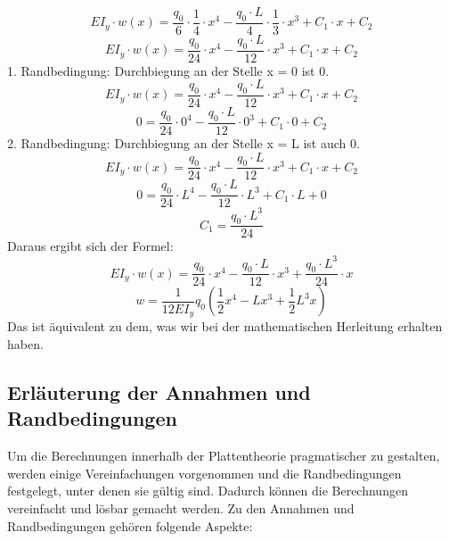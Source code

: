 \begin{equation}
	EI_y\cdot w\left(x\right)=
	\frac{q_0}{6}\cdot\frac{1}{4}\cdot x^4-\frac{q_0\cdot L}{4}\cdot\frac{1}{3}\cdot x^3+C_1\cdot x+C_2
\end{equation}
\begin{equation}
	EI_y\cdot w\left(x\right)=
	\frac{q_0}{24}\cdot x^4-\frac{q_0\cdot L}{12}\cdot x^3+C_1\cdot x+C_2
\end{equation}
1. Randbedingung: Durchbiegung an der Stelle x = 0 ist 0.
\begin{equation}
	EI_y\cdot w\left(x\right)=
	\frac{q_0}{24}\cdot x^4-\frac{q_0\cdot L}{12}\cdot x^3+C_1\cdot x+C_2
\end{equation}
\begin{equation}
	0=
	\frac{q_0}{24}\cdot0^4-\frac{q_0\cdot L}{12}\cdot0^3+C_1\cdot0+C_2
\end{equation}
2. Randbedingung: Durchbiegung an der Stelle x = L ist auch 0.
\begin{equation}
	EI_y\cdot w\left(x\right)=
	\frac{q_0}{24}\cdot x^4-\frac{q_0\cdot L}{12}\cdot x^3+C_1\cdot x+C_2
\end{equation}
\begin{equation}
	0=
	\frac{q_0}{24}\cdot L^4-\frac{q_0\cdot L}{12}\cdot L^3+C_1\cdot L+0
\end{equation}
\begin{equation}
	C_1=
	\frac{q_0\cdot L^3}{24}
\end{equation}
Daraus ergibt sich der Formel:
\begin{equation}
	EI_y\cdot w\left(x\right)=
	\frac{q_0}{24}\cdot x^4-\frac{q_0\cdot L}{12}\cdot x^3+\frac{q_0\cdot L^3}{24}\cdot x
\end{equation}
\begin{equation}
	w=
	\frac{1}{12EI_y}q_0\left(\frac{1}{2}x^4-Lx^3+\frac{1}{2}L^3x\right)
\end{equation}
Das ist äquivalent zu dem, was wir bei der mathematischen Herleitung erhalten haben.

\subsection{Erläuterung der Annahmen und Randbedingungen}
Um die Berechnungen innerhalb der Plattentheorie pragmatischer zu gestalten, werden einige Vereinfachungen vorgenommen und die Randbedingungen festgelegt, unter denen sie gültig sind.
Dadurch können die Berechnungen vereinfacht und lösbar gemacht werden.
Zu den Annahmen und Randbedingungen gehören folgende Aspekte:

